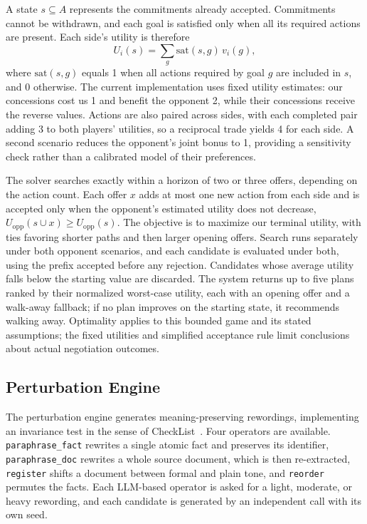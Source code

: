 \documentclass[10pt,twocolumn,letterpaper]{article}
\begin{document}
A state $s\subseteq A$ represents the commitments already accepted. Commitments cannot be withdrawn, and each goal is satisfied only when all its required actions are present. Each side's utility is therefore
\[U_i(s)=\textstyle\sum_g \mathrm{sat}(s,g)\,v_i(g),\]
where $\mathrm{sat}(s,g)$ equals 1 when all actions required by goal $g$ are included in $s$, and 0 otherwise. The current implementation uses fixed utility estimates: our concessions cost us 1 and benefit the opponent 2, while their concessions receive the reverse values. Actions are also paired across sides, with each completed pair adding 3 to both players' utilities, so a reciprocal trade yields 4 for each side. A second scenario reduces the opponent's joint bonus to 1, providing a sensitivity check rather than a calibrated model of their preferences.

The solver searches exactly within a horizon of two or three offers, depending on the action count. Each offer $x$ adds at most one new action from each side and is accepted only when the opponent's estimated utility does not decrease, $U_{\mathrm{opp}}(s\cup x)\ge U_{\mathrm{opp}}(s)$. The objective is to maximize our terminal utility, with ties favoring shorter paths and then larger opening offers. Search runs separately under both opponent scenarios, and each candidate is evaluated under both, using the prefix accepted before any rejection. Candidates whose average utility falls below the starting value are discarded. The system returns up to five plans ranked by their normalized worst-case utility, each with an opening offer and a walk-away fallback; if no plan improves on the starting state, it recommends walking away. Optimality applies to this bounded game and its stated assumptions; the fixed utilities and simplified acceptance rule limit conclusions about actual negotiation outcomes.

\subsection{Perturbation Engine}
The perturbation engine generates meaning-preserving rewordings, implementing an invariance test in the sense of CheckList~\cite{checklist}. Four operators are available. \texttt{paraphrase\_fact} rewrites a single atomic fact and preserves its identifier, \texttt{paraphrase\_doc} rewrites a whole source document, which is then re-extracted, \texttt{register} shifts a document between formal and plain tone, and \texttt{reorder} permutes the facts. Each LLM-based operator is asked for a light, moderate, or heavy rewording, and each candidate is generated by an independent call with its own seed.
\end{document}
